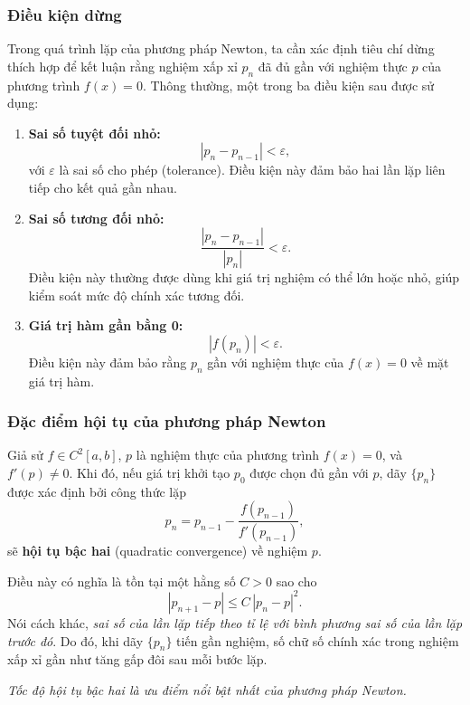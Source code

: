\subsubsection*{Điều kiện dừng}

Trong quá trình lặp của phương pháp Newton, ta cần xác định tiêu chí dừng thích hợp 
để kết luận rằng nghiệm xấp xỉ $p_n$ đã đủ gần với nghiệm thực $p$ của phương trình $f(x)=0$. 
Thông thường, một trong ba điều kiện sau được sử dụng:

\begin{enumerate}
    \item \textbf{Sai số tuyệt đối nhỏ:}
    \[
        |p_{n} - p_{n-1}| < \varepsilon,
    \]
    với $\varepsilon$ là sai số cho phép (tolerance). 
    Điều kiện này đảm bảo hai lần lặp liên tiếp cho kết quả gần nhau.

    \item \textbf{Sai số tương đối nhỏ:}
    \[
        \frac{|p_{n} - p_{n-1}|}{|p_{n}|} < \varepsilon.
    \]
    Điều kiện này thường được dùng khi giá trị nghiệm có thể lớn hoặc nhỏ, 
    giúp kiểm soát mức độ chính xác tương đối.

    \item \textbf{Giá trị hàm gần bằng 0:}
    \[
        |f(p_n)| < \varepsilon.
    \]
    Điều kiện này đảm bảo rằng $p_n$ gần với nghiệm thực của $f(x)=0$ về mặt giá trị hàm.
\end{enumerate}

\subsubsection*{Đặc điểm hội tụ của phương pháp Newton}

Giả sử $f \in C^2[a,b]$, $p$ là nghiệm thực của phương trình $f(x) = 0$, 
và $f'(p) \neq 0$. Khi đó, nếu giá trị khởi tạo $p_0$ được chọn đủ gần với $p$, 
dãy $\{p_n\}$ được xác định bởi công thức lặp
\[
    p_{n} = p_{n-1} - \frac{f(p_{n-1})}{f'(p_{n-1})},
\]
sẽ \textbf{hội tụ bậc hai} (quadratic convergence) về nghiệm $p$.

Điều này có nghĩa là tồn tại một hằng số $C > 0$ sao cho
\[
    |p_{n+1} - p| \leq C\,|p_n - p|^2.
\]
Nói cách khác, \emph{sai số của lần lặp tiếp theo tỉ lệ với bình phương sai số của lần lặp trước đó}. 
Do đó, khi dãy $\{p_n\}$ tiến gần nghiệm, số chữ số chính xác trong nghiệm xấp xỉ gần như tăng gấp đôi sau mỗi bước lặp.

\begin{center}
\textit{Tốc độ hội tụ bậc hai là ưu điểm nổi bật nhất của phương pháp Newton.}
\end{center}

